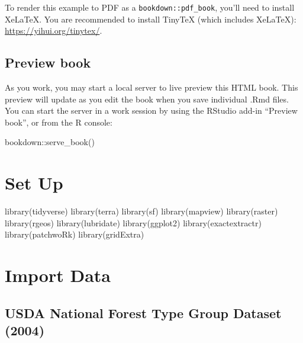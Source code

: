 \documentclass[
]{book}
\newenvironment{Shaded}{\begin{snugshade}}{\end{snugshade}}
\newcommand{\FunctionTok}[1]{\textcolor[rgb]{0.00,0.00,0.00}{#1}}
\newcommand{\NormalTok}[1]{#1}
\newcommand{\SpecialCharTok}[1]{\textcolor[rgb]{0.00,0.00,0.00}{#1}}
\begin{document}
To render this example to PDF as a \texttt{bookdown::pdf\_book}, you'll need to install XeLaTeX. You are recommended to install TinyTeX (which includes XeLaTeX): \url{https://yihui.org/tinytex/}.

\hypertarget{preview-book}{%
\section{Preview book}\label{preview-book}}

As you work, you may start a local server to live preview this HTML book. This preview will update as you edit the book when you save individual .Rmd files. You can start the server in a work session by using the RStudio add-in ``Preview book'', or from the R console:

\begin{Shaded}
\begin{Highlighting}[]
\NormalTok{bookdown}\SpecialCharTok{::}\FunctionTok{serve\_book}\NormalTok{()}
\end{Highlighting}
\end{Shaded}

\hypertarget{set-up}{%
\chapter{Set Up}\label{set-up}}

\begin{Shaded}
\begin{Highlighting}[]
\FunctionTok{library}\NormalTok{(tidyverse)}
\FunctionTok{library}\NormalTok{(terra)}
\FunctionTok{library}\NormalTok{(sf)}
\FunctionTok{library}\NormalTok{(mapview)}
\FunctionTok{library}\NormalTok{(raster)}
\FunctionTok{library}\NormalTok{(rgeos)}
\FunctionTok{library}\NormalTok{(lubridate)}
\FunctionTok{library}\NormalTok{(ggplot2)}
\FunctionTok{library}\NormalTok{(exactextractr)}
\FunctionTok{library}\NormalTok{(patchwoRk)}
\FunctionTok{library}\NormalTok{(gridExtra)}
\end{Highlighting}
\end{Shaded}

\hypertarget{import-data}{%
\chapter{Import Data}\label{import-data}}

\hypertarget{usda-national-forest-type-group-dataset-2004}{%
\section{USDA National Forest Type Group Dataset (2004)}\label{usda-national-forest-type-group-dataset-2004}}
\end{document}
